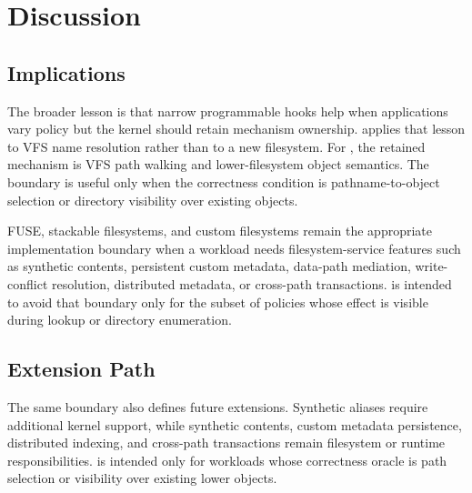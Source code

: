 \section{Discussion}
\label{sec:discussion}

\subsection{Implications}

The broader lesson is that narrow programmable hooks help when applications
vary policy but the kernel should retain mechanism ownership. \namei applies
that lesson to VFS name resolution rather than to a new filesystem. For
\namei, the retained mechanism is VFS path walking and lower-filesystem object
semantics. The \namei boundary is useful only when the correctness condition is
pathname-to-object selection or directory visibility over existing objects.

FUSE, stackable filesystems, and custom filesystems remain the appropriate implementation boundary
when a workload needs filesystem-service features such as synthetic contents,
persistent custom metadata, data-path mediation, write-conflict resolution,
distributed metadata, or cross-path transactions. \namei is intended to avoid
that boundary only for the subset of policies whose effect is visible during
lookup or directory enumeration.

\subsection{Extension Path}

The same boundary also defines future extensions. Synthetic aliases require
additional kernel support, while synthetic contents, custom metadata
persistence, distributed indexing, and cross-path transactions remain filesystem
or runtime responsibilities. \namei is intended only for workloads whose
correctness oracle is path selection or visibility over existing lower objects.
